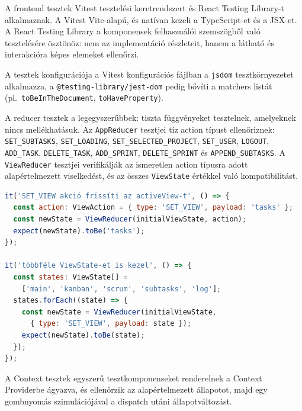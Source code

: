 

A frontend tesztek Vitest \cite{vitest} tesztelési keretrendszert és React Testing Library-t alkalmaznak. A Vitest Vite-alapú, és natívan kezeli a TypeScript-et \cite{typescript} és a JSX-et. A React Testing Library a komponensek felhasználói szemszögből való tesztelésére ösztönöz: nem az implementáció részleteit, hanem a látható és interakcióra képes elemeket ellenőrzi.

A tesztek konfigurációja a Vitest konfigurációs fájlban a \texttt{jsdom} tesztkörnyezetet alkalmazza, a \texttt{@testing-library/jest-dom} pedig bővíti a matchers listát (pl.\ \texttt{toBeIn\-The\-Document}, \texttt{toHaveProperty}).


A reducer tesztek a legegyszerűbbek: tiszta függvényeket tesztelnek, amelyeknek nincs mellékhatásuk. Az \texttt{AppReducer} tesztjei tíz action típust ellenőriznek: \texttt{SET\_SUBTASKS}, \texttt{SET\_LOADING}, \texttt{SET\_SELECTED\_PROJECT}, \texttt{SET\_USER}, \texttt{LOGOUT}, \texttt{ADD\_TASK}, \texttt{DELETE\_TASK}, \texttt{ADD\_SPRINT}, \texttt{DELETE\_SPRINT} és \texttt{APPEND\_SUBTASKS}. A \texttt{ViewReducer} tesztjei verifikálják az ismeretlen action típusra adott alapértelmezett viselkedést, és az összes \texttt{ViewState} értékkel való kompatibilitást.

\begin{lstlisting}[language=JavaScript, caption={ViewReducer tesztek (ViewReducer.test.tsx)}]
it('SET_VIEW akció frissíti az activeView-t', () => {
  const action: ViewAction = { type: 'SET_VIEW', payload: 'tasks' };
  const newState = ViewReducer(initialViewState, action);
  expect(newState).toBe('tasks');
});

it('többféle ViewState-et is kezel', () => {
  const states: ViewState[] =
    ['main', 'kanban', 'scrum', 'subtasks', 'log'];
  states.forEach((state) => {
    const newState = ViewReducer(initialViewState,
      { type: 'SET_VIEW', payload: state });
    expect(newState).toBe(state);
  });
});
\end{lstlisting}


A Context tesztek egyszerű tesztkomponenseket renderelnek a Context Providerbe ágyazva, és ellenőrzik az alapértelmezett állapotot, majd egy gombnyomás szimulációjával a dispatch utáni állapotváltozást.

